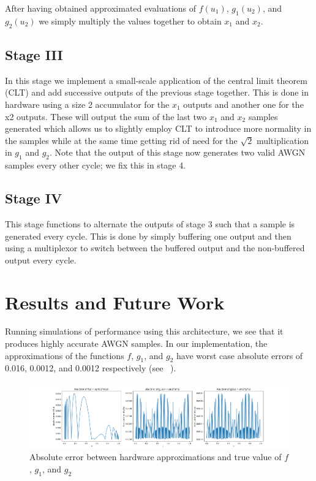 After having obtained approximated evaluations of $f(u_1)$, $g_1(u_2)$, and $g_2(u_2)$ we simply multiply the values together to obtain $x_1$ and $x_2$.

\subsection{Stage III}
In this stage we implement a small-scale application of the central limit theorem (CLT) and add successive outputs of the previous stage together. This is done in hardware using a size 2 accumulator for the $x_1$ outputs and another one for the x2 outputs. These will output the sum of the last two $x_1$ and $x_2$ samples generated which allows us to slightly employ CLT to introduce more normality in the samples while at the same time getting rid of need for the 
$\sqrt{2}$ multiplication in $g_1$ and $g_2$. Note that the output of this stage now generates two valid AWGN samples every other cycle; we fix this in stage 4.
\subsection{Stage IV}
This stage functions to alternate the outputs of stage 3 such that a sample is generated every cycle. This is done by simply buffering one output and then using a multiplexor to switch between the buffered output and the non-buffered output every cycle.

\section{Results and Future Work}

Running simulations of performance using this architecture, we see that it produces highly accurate AWGN samples. In our implementation, the approximations of the functions $f$, $g_1$, and $g_2$ have worst case absolute errors of 0.016, 0.0012, and 0.0012 respectively (see \Figure~). 

\begin{figure}
\centering\CaptionFontSize
\includegraphics[width=\textwidth]
{Figures/approx_error.png}
\caption[Absolute error between hardware approximations and true value of $f$, $g_1$, and $g_2$]
{Absolute error between hardware approximations and true value of $f$, $g_1$, and $g_2$}
\label{Figure:NoiseGeneration:ApproximationError}
\end{figure}

